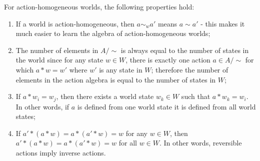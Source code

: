 For action-homogeneous worlds, the following properties hold:
\begin{enumerate}
	\item If a world is action-homogeneous, then $a \sim_{w} a'$ means $a \sim a'$ - this makes it much easier to learn the algebra of action-homogeneous worlds;

	\item The number of elements in $A/\sim$ is always equal to the number of states in the world since for any state $w \in W$, there is exactly one action $a \in A/\sim$ for which $a * w = w'$ where $w'$ is any state in $W$; therefore the number of elements in the action algebra is equal to the number of states in $W$;

	\item If $a * w_{i} = w_{j}$, then there exists a world state $w_{k} \in W$ such that $a * w_{k} = w_{i}$.
	      In other words, if $a$ is defined from one world state it is defined from all world states;

	\item If $a' * (a * w) = a * (a' * w) = w$ for any $w \in W$, then $a' * (a * w) = a * (a' * w) = w$ for all $w \in W$.
	      In other words, reversible actions imply inverse actions.
\end{enumerate}

